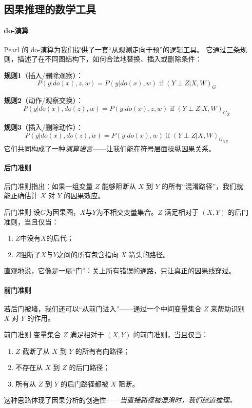 \subsection{因果推理的数学工具}

\paragraph{do-演算}
Pearl 的 do-演算为我们提供了一套“从观测走向干预”的逻辑工具。  
它通过三条规则，描述了在不同图结构下，如何合法地替换、插入或删除条件：

\textbf{规则1}（插入/删除观察）：
$$P(y|do(x), z, w) = P(y|do(x), w) \text{ if } (Y \perp Z | X, W)_G$$

\textbf{规则2}（动作/观察交换）：
$$P(y|do(x), do(z), w) = P(y|do(x), z, w) \text{ if } (Y \perp Z | X, W)_{G_{\overline{X}}}$$

\textbf{规则3}（插入/删除动作）：
$$P(y|do(x), do(z), w) = P(y|do(x), w) \text{ if } (Y \perp Z | X, W)_{G_{\overline{X}\underline{Z}}}$$
它们共同构成了一种\emph{演算语言}——让我们能在符号层面操纵因果关系。

\paragraph{后门准则}
后门准则指出：如果一组变量 $Z$ 能够阻断从 $X$ 到 $Y$ 的所有“混淆路径”，我们就能正确估计 $X$ 对 $Y$ 的因果效应。  
\begin{definition}[]{后门准则}
设$G$为因果图，$X$与$Y$为不相交变量集合。$Z$ 满足相对于 $(X,Y)$ 的后门准则，当且仅当：
\begin{enumerate}
\item $Z$中没有$X$的后代；
\item $Z$阻断了$X$与$Y$之间的所有包含指向 $X$ 箭头的路径。
\end{enumerate}
\end{definition}
直观地说，它像是一扇“门”：关上所有错误的通路，只让真正的因果线穿过。

\paragraph{前门准则}
若后门被堵，我们还可以“从前门进入”——通过一个中间变量集合 $Z$ 来帮助识别 $X$ 对 $Y$ 的作用。  
\begin{definition}[]{前门准则}
变量集合 $Z$ 满足相对于 $(X,Y)$ 的前门准则，当且仅当：
\begin{enumerate}
\item $Z$ 截断了从 $X$ 到 $Y$ 的所有有向路径；
\item 不存在从 $X$ 到 $Z$ 的后门路径；
\item 所有从 $Z$ 到 $Y$ 的后门路径都被 $X$ 阻断。
\end{enumerate}
\end{definition}
这种思路体现了因果分析的创造性——\emph{当直接路径被混淆时，我们绕道推理。}

